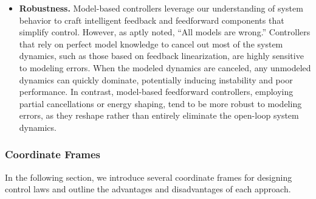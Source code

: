 \begin{itemize}
    \item \textbf{Robustness.} 
    Model-based controllers leverage our understanding of system behavior to craft intelligent feedback and feedforward components that simplify control. However, as \citet{box1976science} aptly noted, “All models are wrong.” Controllers that rely on perfect model knowledge to cancel out most of the system dynamics, such as those based on feedback linearization, are highly sensitive to modeling errors. When the modeled dynamics are canceled, any unmodeled dynamics can quickly dominate, potentially inducing instability and poor performance. In contrast, model-based feedforward controllers, employing partial cancellations or energy shaping, tend to be more robust to modeling errors, as they reshape rather than entirely eliminate the open-loop system dynamics.
\end{itemize}

\subsubsection{Coordinate Frames}
In the following section, we introduce several coordinate frames for designing control laws and outline the advantages and disadvantages of each approach.

